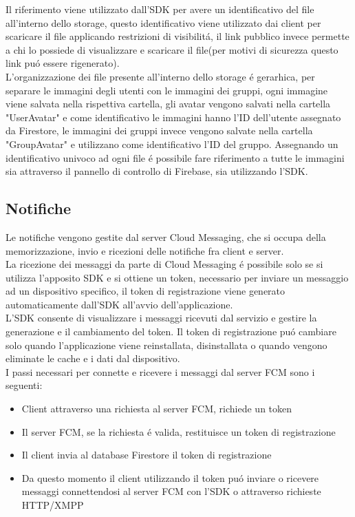 Il riferimento viene utilizzato dall'SDK per avere un identificativo del file all'interno dello storage, questo identificativo viene utilizzato dai client per scaricare il file applicando restrizioni di visibilit\'a, il link pubblico invece permette a chi lo possiede di visualizzare e scaricare il file(per motivi di sicurezza questo link pu\'o essere rigenerato).\\
L'organizzazione dei file presente all'interno dello storage \'e gerarhica, per separare le immagini degli utenti con le immagini dei gruppi, ogni immagine viene salvata nella rispettiva cartella, gli avatar vengono salvati nella cartella "UserAvatar" e come identificativo le immagini hanno l'ID dell'utente assegnato da Firestore, le immagini dei gruppi invece vengono salvate nella cartella "GroupAvatar" e utilizzano come identificativo l'ID del gruppo.
Assegnando un identificativo univoco ad ogni file \'e possibile fare riferimento a tutte le immagini sia attraverso il pannello di controllo di Firebase, sia utilizzando l'SDK.\\




\subsection{Notifiche}
Le notifiche vengono gestite dal server Cloud Messaging, che si occupa della memorizzazione, invio e ricezioni delle notifiche fra client e server.\\
La ricezione dei messaggi da parte di Cloud Messaging \'e possibile solo se si utilizza l'apposito SDK e si ottiene un token, necessario per inviare un messaggio ad un dispositivo specifico, il token di registrazione viene generato automaticamente dall'SDK all'avvio dell'applicazione.\\
L'SDK consente di visualizzare i messaggi ricevuti dal servizio e gestire la generazione e il cambiamento del token. Il token di registrazione pu\'o cambiare solo quando l'applicazione viene reinstallata, disinstallata o quando vengono eliminate le cache e i dati dal dispositivo.\\
I passi necessari per connette e ricevere i messaggi dal server FCM sono i seguenti:
\begin{itemize}
    \item Client attraverso una richiesta al server FCM, richiede un token
    \item Il server FCM, se la richiesta \'e valida, restituisce un token di registrazione
    \item Il client invia al database Firestore il token di registrazione
    \item Da questo momento il client utilizzando il token pu\'o inviare o ricevere messaggi connettendosi al server FCM con l'SDK o attraverso richieste HTTP/XMPP
\end{itemize}

